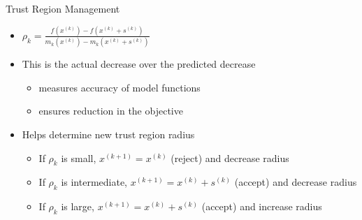 \documentclass{beamer}
\begin{document}
\begin{frame}{Trust Region Management}
    \setlength\itemsep{2em}
    \begin{itemize}
		\item $\rho_k = \frac{f(x^{(k)}) - f(x^{(k)}+s^{(k)})}{m_k(x^{(k)}) - m_k(x^{(k)}+s^{(k)})}$
        \item This is the actual decrease over the predicted decrease
        \begin{itemize}
            \item measures accuracy of model functions
            \item ensures reduction in the objective
        \end{itemize}
        \item Helps determine new trust region radius
		\begin{itemize}
		    \item If $\rho_k$ is small, $x^{(k+1)}=x^{(k)}$ (reject) and decrease radius
		    \item If $\rho_k$ is intermediate, $x^{(k+1)}=x^{(k)}+s^{(k)}$ (accept) and decrease radius
		    \item If $\rho_k$ is large, $x^{(k+1)}=x^{(k)}+s^{(k)}$ (accept) and increase radius
		\end{itemize}
    \end{itemize}
\end{frame}
\end{document}
